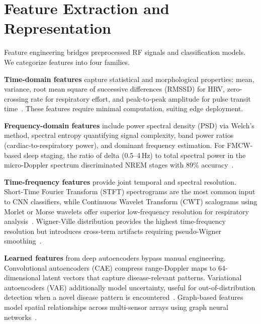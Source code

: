 \documentclass[journal,twoside]{IEEEtran}
\begin{document}
\section{Feature Extraction and Representation}

Feature engineering bridges preprocessed RF signals and classification models. We categorize features into four families.

\textbf{Time-domain features} capture statistical and morphological properties: mean, variance, root mean square of successive differences (RMSSD) for HRV, zero-crossing rate for respiratory effort, and peak-to-peak amplitude for pulse transit time~\cite{ref_wearable_cardio2025}. These features require minimal computation, suiting edge deployment.

\textbf{Frequency-domain features} include power spectral density (PSD) via Welch's method, spectral entropy quantifying signal complexity, band power ratios (cardiac-to-respiratory power), and dominant frequency estimation. For FMCW-based sleep staging, the ratio of delta (0.5--4\,Hz) to total spectral power in the micro-Doppler spectrum discriminated NREM stages with 89\% accuracy~\cite{ref_eeg_sleep2023}.

\textbf{Time-frequency features} provide joint temporal and spectral resolution. Short-Time Fourier Transform (STFT) spectrograms are the most common input to CNN classifiers, while Continuous Wavelet Transform (CWT) scalograms using Morlet or Morse wavelets offer superior low-frequency resolution for respiratory analysis~\cite{ref_radar_complex2025}. Wigner-Ville distribution provides the highest time-frequency resolution but introduces cross-term artifacts requiring pseudo-Wigner smoothing~\cite{ref_comprehensive_dataset2024}.

\textbf{Learned features} from deep autoencoders bypass manual engineering. Convolutional autoencoders (CAE) compress range-Doppler maps to 64-dimensional latent vectors that capture disease-relevant patterns. Variational autoencoders (VAE) additionally model uncertainty, useful for out-of-distribution detection when a novel disease pattern is encountered~\cite{ref_mlrf_sensing2025}. Graph-based features model spatial relationships across multi-sensor arrays using graph neural networks~\cite{ref_multimodal_eeg2024}.
\end{document}
